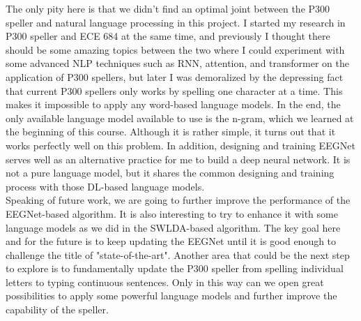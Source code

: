 \documentclass{article}
\begin{document}
\vspace{-3mm}
The only pity here is that we didn't find an optimal joint between the P300 speller and natural language processing in this project. I started my research in P300 speller and ECE 684 at the same time, and previously I thought there should be some amazing topics between the two where I could experiment with some advanced NLP techniques such as RNN, attention, and transformer on the application of P300 spellers, but later I was demoralized by the depressing fact that current P300 spellers only works by spelling one character at a time. This makes it impossible to apply any word-based language models. In the end, the only available language model available to use is the n-gram, which we learned at the beginning of this course. Although it is rather simple, it turns out that it works perfectly well on this problem. In addition, designing and training EEGNet serves well as an alternative practice for me to build a deep neural network. It is not a pure language model, but it shares the common designing and training process with those DL-based language models.\\

\vspace{-3mm}
Speaking of future work, we are going to further improve the performance of the EEGNet-based algorithm. It is also interesting to try to enhance it with some language models as we did in the SWLDA-based algorithm. The key goal here and for the future is to keep updating the EEGNet until it is good enough to challenge the title of "state-of-the-art". Another area that could be the next step to explore is to fundamentally update the P300 speller from spelling individual letters to typing continuous sentences. Only in this way can we open great possibilities to apply some powerful language models and further improve the capability of the speller.


{\small }
\end{document}
